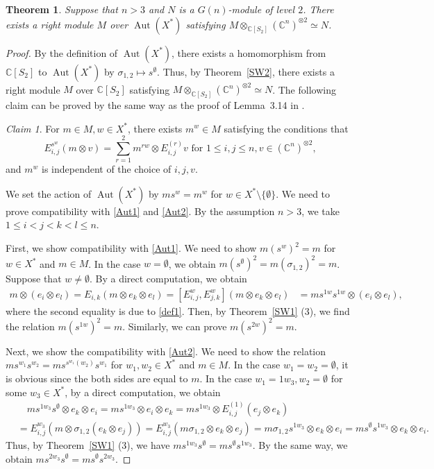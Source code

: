 \documentclass{article}
\newtheorem{Theorem}[equation]{Theorem}
\theoremstyle{definition}
\theoremstyle{remark}
\numberwithin{equation}{section}
\newtheorem{Claim}[equation]{Claim}
\DeclareMathOperator{\Aut}{Aut}
\numberwithin{equation}{section}
\begin{document}
\begin{Theorem}\label{SW128}
Suppose that $n>3$ and $N$ is a $G(n)$-module of level $2$. There exists a right module $M$ over $\Aut(X^*)$ satisfying $M\otimes_{\mathbb{C}[S_2]}(\mathbb{C}^n)^{\otimes2}\simeq N$. 
\end{Theorem}
\begin{proof}
By the definition of $\Aut(X^*)$, there exists a homomorphism from $\mathbb{C}[S_2]$ to $\Aut(X^*)$ by $\sigma_{1,2}\mapsto s^\emptyset$.
Thus, by Theorem~\ref{SW2}, there exists a right module $M$ over $\mathbb{C}[S_2]$ satisfying $M\otimes_{\mathbb{C}[S_2]}(\mathbb{C}^n)^{\otimes2}\simeq N$. The following claim can be proved by the same way as the proof of Lemma~3.14 in \cite{GJU}.
\begin{Claim}\label{Lem2}
For $m\in M,w\in X^*$, there exists $m^{w}\in M$ satisfying the conditions that
\[
E^{s^w}_{i,j}(m\otimes v)=\sum_{r=1}^2m^{rw}\otimes E^{(r)}_{i,j}v\text{ for }1\leq i,j\leq n,v\in(\mathbb{C}^n)^{\otimes2},
\]
and $m^w$ is independent of the choice of $i,j,v$.
\end{Claim}
We set the action of $\Aut(X^*)$ by $ms^w=m^w$ for $w\in X^*\setminus\{\emptyset\}$. We need to prove compatibility with \eqref{Aut1} and \eqref{Aut2}. By the assumption $n>3$, we take $1\leq i<j<k<l\leq n$. 

First, we show compatibility with \eqref{Aut1}. We need to show $m(s^w)^2=m$ for $w\in X^*$ and $m\in M$. In the case $w=\emptyset$, we obtain $m(s^\emptyset)^2=m(\sigma_{1,2})^2=m$.
Suppose that $w\neq\emptyset$.
By a direct computation, we obtain
\begin{align*}
m\otimes (e_{i}\otimes e_{l})=E_{i,k}(m\otimes e_k\otimes e_l)=[E^{w}_{i,j},E^w_{j,k}](m\otimes e_k\otimes e_l)&=ms^{1w}s^{1w}\otimes (e_{i}\otimes e_{l}),
\end{align*}
where the second equality is due to \eqref{def1}.
Then, by Theorem~\ref{SW1} (3), we find the relation $m(s^{1w})^2=m$. Similarly, we can prove $m(s^{2w})^2=m$.

Next, we show the compatibility with \eqref{Aut2}.
We need to show the relation $ms^{w_1}s^{w_2}=ms^{s^{w_1}(w_2)}s^{w_1}$ for $w_1,w_2\in X^*$ and $m\in M$. In the case $w_1=w_2=\emptyset$, it is obvious since the both sides are equal to $m$. In the case $w_1=1w_3,w_2=\emptyset$ for some $w_3\in X^*$, by a direct computation, we obtain
\begin{align*}
&\quad ms^{1w_3}s^\emptyset\otimes e_k\otimes e_i=ms^{1w_3}\otimes e_i\otimes e_k=ms^{1w_3}\otimes E^{(1)}_{i,j}(e_j\otimes e_k)\\
&=E^{w_3}_{i,j}(m\otimes \sigma_{1,2}(e_k\otimes e_j))=E^{w_3}_{i,j}(m\sigma_{1,2}\otimes e_k\otimes e_j)=m\sigma_{1,2}s^{1w_3}\otimes e_k\otimes e_i=ms^\emptyset s^{1w_3}\otimes e_k\otimes e_i.
\end{align*}
Thus, by Theorem~\ref{SW1} (3), we have $ms^{1w_3}s^\emptyset=ms^\emptyset s^{1w_3}$. By the same way, we obtain  
$ms^{2w_3}s^\emptyset=ms^\emptyset s^{2w_3}$.


\end{proof}
\end{document}
